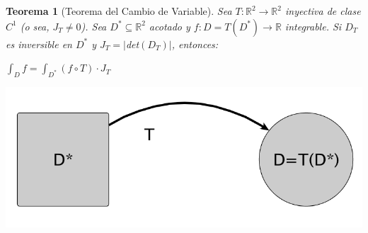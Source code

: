\documentclass[]{article}
\newtheorem{teo}{Teorema}
\def\R{\mathbb{R}}
\newcommand{\intres}[3]{\int_{#1}^{#2} \! #3}
\begin{document}
\begin{teo}[Teorema del Cambio de Variable]
	Sea $T:\R^2\to\R^2$ inyectiva de clase $C^1$ (o sea, $J_T \neq 0$). Sea $D^*\subseteq\R^2$ acotado y $f:D=T(D^*)\to\R$ integrable. Si $D_T$ es inversible en $D^*$ y $J_T = |$det$(D_T)|$, entonces:
	\begin{center}
		$\displaystyle \intres{D}{}{f} = \intres{D^*}{}{(f\circ T)\cdot J_T}$
	\end{center}
	\begin{center}
		\includegraphics[scale=0.50]{CV.png}
	\end{center}
\end{teo}



\end{document}

